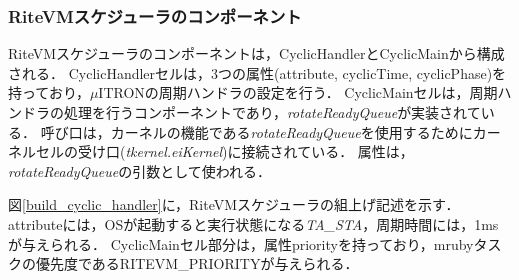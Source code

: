 \documentclass[submit,techrep]{ipsj}
\begin{document}
\subsubsection{RiteVMスケジューラのコンポーネント}
RiteVMスケジューラのコンポーネントは，CyclicHandlerとCyclicMainから構成される．
CyclicHandlerセルは，3つの属性(attribute, cyclicTime, cyclicPhase)を持っており，$\mu$ITRONの周期ハンドラ\cite{par:microITRON}の設定を行う．
CyclicMainセルは，周期ハンドラの処理を行うコンポーネントであり，{\it rotateReadyQueue}が実装されている．
呼び口は，カーネルの機能である{\it rotateReadyQueue}を使用するためにカーネルセルの受け口({\it tkernel.eiKernel})に接続されている．
属性は，{\it rotateReadyQueue}の引数として使われる．

図\ref{build_cyclic_handler}に，RiteVMスケジューラの組上げ記述を示す．
attributeには，OSが起動すると実行状態になる{\it TA\_STA}，周期時間には，1msが与えられる．
CyclicMainセル部分は，属性priorityを持っており，mrubyタスクの優先度であるRITEVM\_PRIORITYが与えられる．
\end{document}

